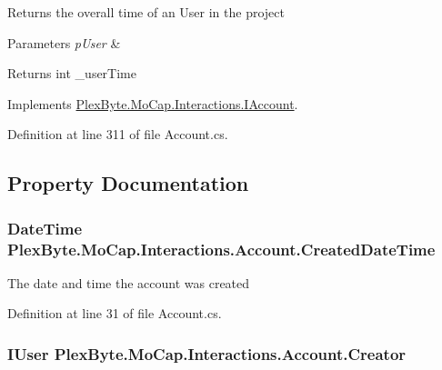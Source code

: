 Returns the overall time of an User in the project 


\begin{DoxyParams}{Parameters}
{\em p\+User} & \\
\hline
\end{DoxyParams}
\begin{DoxyReturn}{Returns}
int \+\_\+user\+Time
\end{DoxyReturn}


Implements \hyperlink{interface_plex_byte_1_1_mo_cap_1_1_interactions_1_1_i_account_a75c8a9171f868234d85ced97117b1b8b}{Plex\+Byte.\+Mo\+Cap.\+Interactions.\+I\+Account}.



Definition at line 311 of file Account.\+cs.



\subsection{Property Documentation}
\subsubsection[{\texorpdfstring{Created\+Date\+Time}{CreatedDateTime}}]{\setlength{\rightskip}{0pt plus 5cm}Date\+Time Plex\+Byte.\+Mo\+Cap.\+Interactions.\+Account.\+Created\+Date\+Time\hspace{0.3cm}{\ttfamily [get]}}\hypertarget{class_plex_byte_1_1_mo_cap_1_1_interactions_1_1_account_a5479e6c738ee5788378895820d71e24a}{}\label{class_plex_byte_1_1_mo_cap_1_1_interactions_1_1_account_a5479e6c738ee5788378895820d71e24a}


The date and time the account was created 



Definition at line 31 of file Account.\+cs.

\subsubsection[{\texorpdfstring{Creator}{Creator}}]{\setlength{\rightskip}{0pt plus 5cm}I\+User Plex\+Byte.\+Mo\+Cap.\+Interactions.\+Account.\+Creator\hspace{0.3cm}{\ttfamily [get]}}\hypertarget{class_plex_byte_1_1_mo_cap_1_1_interactions_1_1_account_ab04766b742ba744b403e1e24f702b0d1}{}\label{class_plex_byte_1_1_mo_cap_1_1_interactions_1_1_account_ab04766b742ba744b403e1e24f702b0d1}


